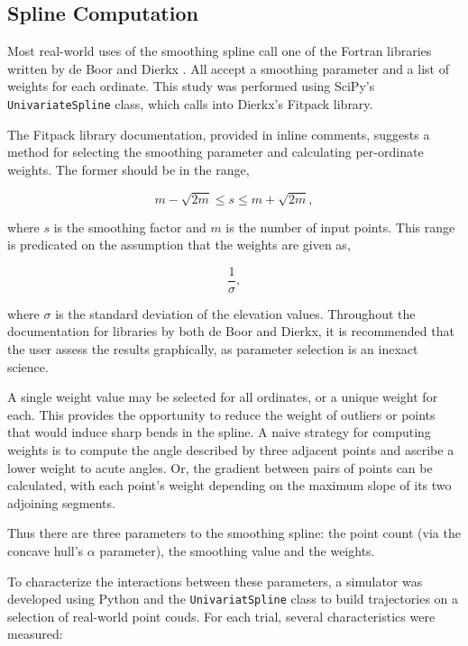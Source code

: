 \documentclass[doc]{apa6}
\begin{document}
\subsection{Spline Computation}

Most real-world uses of the smoothing spline call one of the Fortran libraries written by de Boor \parencite{deBoor1980} and Dierkx \parencite{Dierckx:1993:CSF:151103}. All accept a smoothing parameter and a list of weights for each ordinate. This study was performed using SciPy's \lstinline{UnivariateSpline}{} class, which calls into Dierkx's Fitpack library. 

The Fitpack library documentation, provided in inline comments, suggests a method for selecting the smoothing parameter and calculating per-ordinate weights. The former should be in the range,

\begin{equation}
m - \sqrt{2m} \leq s \leq m + \sqrt{2m},
\end{equation}

where $s$ is the smoothing factor and $m$ is the number of input points. This range is predicated on the assumption that the weights are given as,

\begin{equation}
\frac{1}{\sigma},
\end{equation}

where $\sigma$ is the standard deviation of the elevation values. Throughout the documentation for libraries by both de Boor and Dierkx, it is recommended that the user assess the results graphically, as parameter selection is an inexact science. 

A single weight value may be selected for all ordinates, or a unique weight for each. This provides the opportunity to reduce the weight of outliers or points that would induce sharp bends in the spline. A naive strategy for computing weights is to compute the angle described by three adjacent points and ascribe a lower weight to acute angles. Or, the gradient between pairs of points can be calculated, with each point's weight depending on the maximum slope of its two adjoining segments.

Thus there are three parameters to the smoothing spline: the point count (via the concave hull's $\alpha$ parameter), the smoothing value and the weights. 

To characterize the interactions between these parameters, a simulator was developed using Python and the \lstinline{UnivariatSpline}{} class to build trajectories on a selection of real-world point couds. For each trial, several characteristics were measured:
\end{document}
